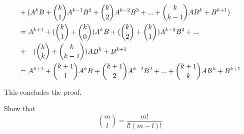 \documentclass[11pt,onecolumn]{article}
\begin{document}
\begin{answer}
\begin{itemize}
\begin{align*}
        &+ (A^kB + \binom{k}{1} A^{k-1}B^2 + \binom{k}{2}A^{k-2}B^3 + ... + \binom{k}{k-1}AB^{k} + B^{k+1}) \\
        &= A^{k+1} + (\binom{k}{1}+\binom{k}{0}) A^{k}B + (\binom{k}{2}+\binom{k}{1})A^{k-2}B^2 + ... \\ &+ \hspace{3mm} (\binom{k}{k}+\binom{k}{k-1})AB^{k} + B^{k+1} \\
        &= A^{k+1} + \binom{k+1}{1}A^kB + \binom{k+1}{2}A^{k-2}B^2 + ... + \binom{k+1}{k}AB^{k} + B^{k+1}
    \end{align*}
\end{itemize}
This concludes the proof.
\end{answer}
\begin{exercise}
Show that $$ \binom{m}{l} = \frac{m!}{l!(m-l)!} $$
\end{exercise}
\end{document}
